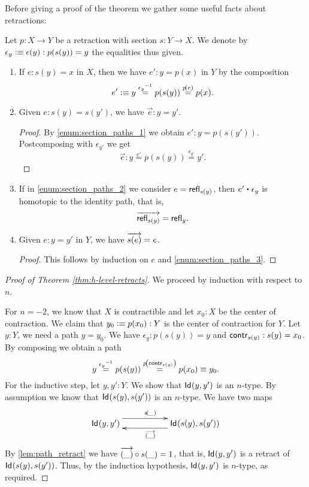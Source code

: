 Before giving a proof of the theorem we gather some useful facts about retractions:

\begin{lem}\label{lem:path_retract}
 Let $p \colon X \to Y$ be a retraction with section $s \colon Y \to X$.
 We denote by $\epsilon_y \defeq \epsilon(y) : p(s(y)) = y$ the equalities thus given.
 \begin{enumerate}
  \item \label{enum:section_paths_1}
      If $e : s(y) = x$ in $X$, then we have $e' :  y = p(x)$ in $Y$
        by the composition
     \[e' \defeq y \stackrel{\opp{\epsilon_y}}{=} p(s(y)) \stackrel{\map{p}{e}}{=} p(x)  .\]

  \item \label{enum:section_paths_2}
      Given $e : s(y) = s(y')$, we have $\vec e : y = y'$.
     \begin{proof}
	By \ref{enum:section_paths_1} we obtain $e' : y = p(s(y'))$.
        Postcomposing with $\epsilon_{y'}$ we get
           \[ \overrightarrow{e} : y \stackrel{e'}{=} p(s(y)) \stackrel{\epsilon_{y'}}{=} y'  . \]
     \end{proof}

  \item \label{enum:section_paths_3}
        If in \ref{enum:section_paths_2} we consider $e = \refl{s(y)}$, then $e' \ct \epsilon_{y}$
        is homotopic to the identity path, that is,
          \[ \overrightarrow{\refl{s(y)}} = \refl{y}  . \]

  \item Given $e : y = y'$ in $Y$, we have $\overrightarrow{\map{s}{e}} = e$.
      \begin{proof}
       This follows by induction on $e$ and \ref{enum:section_paths_3}.
      \end{proof}

 \end{enumerate}

\end{lem}


\begin{proof}[Proof of Theorem \autoref{thm:h-level-retracts}]
 We proceed by induction with respect to $n$.

 For $n=-2$, we know that $X$ is contractible and let $x_0 : X$ be the center of contraction.
 We claim that $y_0 \defeq p(x_0) : Y$ is the center of contraction for $Y$.
 Let $y : Y$, we need a path $y = y_0$. We have $\epsilon_y : p(s(y)) = y$ and $\contr_{s(y)} : s(y) = x_0$.
 By composing we obtain a path
 \[ y \stackrel{\opp{\epsilon_y}}{=} p(s(y)) \stackrel{\map{p}{\contr_{s(y)}}}{=} p(x_0) \equiv y_0  . \]
 For the inductive step, let $y, y' : Y$. We show that $\idtype {y}{y'}$ is an $n$-type.
 By assumption we know that $\idtype{s(y)}{s(y')}$ is an $n$-type.
 We have two maps
 \[\xymatrix{\idtype{y}{y'} \ar@<1.5ex>[rr]^{\map{s}{\_}} & & \idtype{s(y)}{s(y')} \ar@<1.2ex>[ll]^{\overrightarrow{(\_)}}}\]
  By \autoref{lem:path_retract} we have $\comp{\map{s}{\_}}{\overrightarrow{(\_)}} = 1$,
   that is, $\idtype {y}{y'}$ is a retract of $\idtype{s(y)}{s(y')}$.
    Thus, by the induction hypothesis, $\idtype {y}{y'}$ is $n$-type, as required.
\end{proof}

